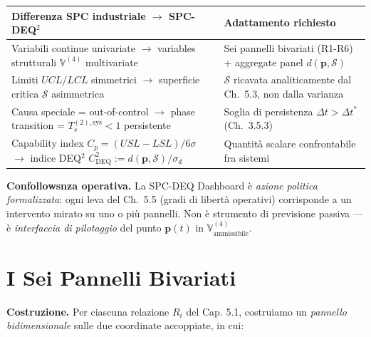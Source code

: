 {\def\LTcaptype{none} %
{\small\begin{longtable}[]{@{}
  >{\raggedright\arraybackslash}p{}
  >{\raggedright\arraybackslash}p{}@{}}
\toprule\noalign{}
\begin{minipage}[b]{\linewidth}\raggedright
Differenza SPC industriale $\to$ SPC-DEQ$^2$
\end{minipage} & \begin{minipage}[b]{\linewidth}\raggedright
Adattamento richiesto
\end{minipage} \\
\midrule\noalign{}
\endhead
\bottomrule\noalign{}
\endlastfoot
Variabili continue univariate $\to$ variables strutturali
\(\mathbb{V}^{(4)}\) multivariate & Sei pannelli bivariati (R1-R6) +
aggregate panel \(d(\boldsymbol{p}, \mathcal{S})\) \\
Limiti \(UCL/LCL\) simmetrici $\to$ superficie critica \(\mathcal{S}\)
asimmetrica & \(\mathcal{S}\) ricavata analiticamente dal Ch.~5.3, non
dalla varianza \\
Causa speciale = out-of-control $\to$ phase transition =
\(T_s^{(2),\text{sys}} < 1\) persistente & Soglia di persistenza
\(\Delta t > \Delta t^*\) (Ch.~3.5.3) \\
Capability index \(C_p = (USL-LSL)/6\sigma\) $\to$ indice DEQ$^2$
\(C_{\text{DEQ}}^2 := d(\boldsymbol{p}, \mathcal{S}) / \sigma_d\) &
Quantità scalare confrontabile fra sistemi \\
\end{longtable}}
}

\Proved{} \textbf{Confollowsnza operativa.} La SPC-DEQ Dashboard è
\emph{azione politica formalizzata}: ogni leva del Ch.~5.5 (gradi di
libertà operativi) corrisponde a un intervento mirato su uno o più
pannelli. Non è strumento di previsione passiva --- è \emph{interfaccia
di pilotaggio} del punto \(\boldsymbol{p}(t)\) in
\(\mathbb{V}^{(4)}_{\text{ammissibile}}\).



\section{I Sei Pannelli Bivariati}\label{i-sei-pannelli-bivariati}

\Hypoth{} \textbf{Costruzione.} Per ciascuna relazione \(R_i\) del Cap.
5.1, costruiamo un \emph{pannello bidimensionale} sulle due coordinate
accoppiate, in cui:

